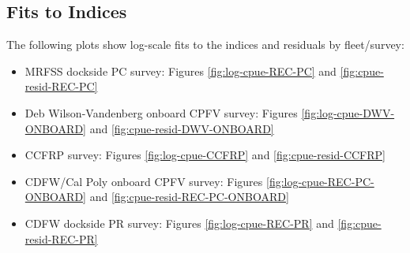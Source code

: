 \documentclass[
  english,
  a4paper,
]{article}
\begin{document}
\hypertarget{fits-to-indices}{%
\subsection{Fits to Indices}\label{fits-to-indices}}

The following plots show log-scale fits to the indices and residuals by fleet/survey:

\begin{itemize}
\item
  MRFSS dockside PC survey: Figures \ref{fig:log-cpue-REC-PC} and \ref{fig:cpue-resid-REC-PC}
\item
  Deb Wilson-Vandenberg onboard CPFV survey: Figures \ref{fig:log-cpue-DWV-ONBOARD} and \ref{fig:cpue-resid-DWV-ONBOARD}
\item
  CCFRP survey: Figures \ref{fig:log-cpue-CCFRP} and \ref{fig:cpue-resid-CCFRP}
\item
  CDFW/Cal Poly onboard CPFV survey: Figures \ref{fig:log-cpue-REC-PC-ONBOARD} and \ref{fig:cpue-resid-REC-PC-ONBOARD}
\item
  CDFW dockside PR survey: Figures \ref{fig:log-cpue-REC-PR} and \ref{fig:cpue-resid-REC-PR}
\end{itemize}
\end{document}
